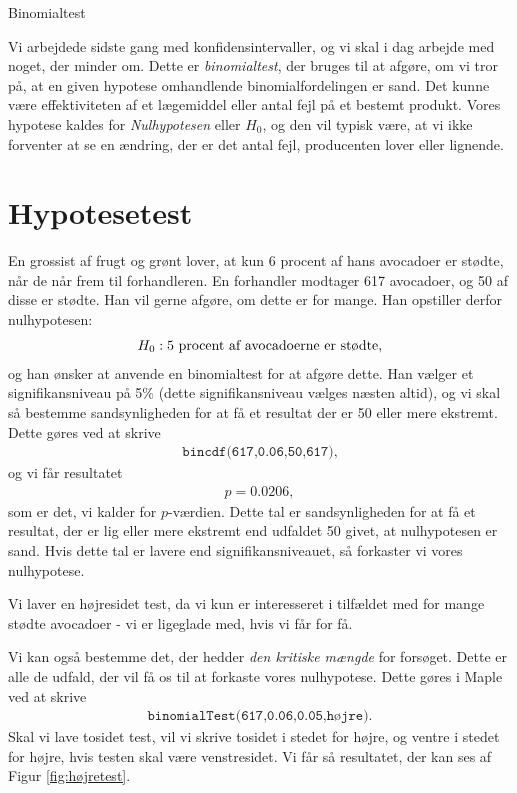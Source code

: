 
\begin{center}
\Huge
Binomialtest
\end{center}

Vi arbejdede sidste gang med konfidensintervaller, og vi skal i dag arbejde med noget, der minder om. Dette er \textit{binomialtest}, der bruges til at afgøre, om vi tror på, at en given hypotese omhandlende binomialfordelingen er sand. Det kunne være effektiviteten af et lægemiddel eller antal fejl på et bestemt produkt. Vores hypotese kaldes for \textit{Nulhypotesen} eller $H_0$, og den vil typisk være, at vi ikke forventer at se en ændring, der er det antal fejl, producenten lover eller lignende.

\section*{Hypotesetest}

En grossist af frugt og grønt lover, at kun 6 procent af hans avocadoer er stødte, når de når frem til forhandleren. En forhandler modtager 617 avocadoer, og 50 af disse er stødte. Han vil gerne afgøre, om dette er for mange. Han opstiller derfor nulhypotesen:
\begin{align*}
	H_0: \textnormal{5 procent af avocadoerne er stødte},
\end{align*}
og han ønsker at anvende en binomialtest for at afgøre dette. Han vælger et signifikansniveau på 5$\%$ (dette signifikansniveau vælges næsten altid), og vi skal så bestemme sandsynligheden for at få et resultat der er 50 eller mere ekstremt. Dette gøres ved at skrive
\begin{align*}
	\texttt{bincdf(617,0.06,50,617)},
\end{align*}
og vi får resultatet
\begin{align*}
	p = 0.0206,
\end{align*}
som er det, vi kalder for $p$-værdien. Dette tal er sandsynligheden for at få et resultat, der er lig eller mere ekstremt end udfaldet 50 givet, at nulhypotesen er sand. Hvis dette tal er lavere end signifikansniveauet, så forkaster vi vores nulhypotese.

Vi laver en højresidet test, da vi kun er interesseret i tilfældet med for mange stødte avocadoer - vi er ligeglade med, hvis vi får for få. 

Vi kan også bestemme det, der hedder \textit{den kritiske mængde} for forsøget. Dette er alle de udfald, der vil få os til at forkaste vores nulhypotese. Dette gøres i Maple ved at skrive
\begin{align*}
	\texttt{binomialTest(617,0.06,0.05,højre)}.
\end{align*}
Skal vi lave tosidet test, vil vi skrive tosidet i stedet for højre, og ventre i stedet for højre, hvis testen skal være venstresidet. 
Vi får så resultatet, der kan ses af Figur \ref{fig:højretest}.

